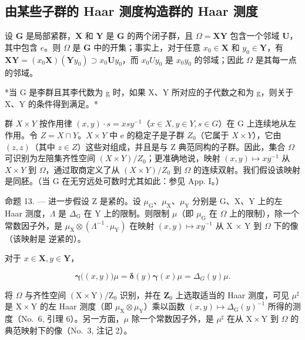 \subsection{由某些子群的 Haar 测度构造群的 Haar 测度}

设 \(\mathbf{G}\) 是局部紧群，\(\mathbf{X}\) 和 \(\mathbf{Y}\) 是 \(\mathbf{G}\) 的两个闭子群，且 \(\Omega = \mathbf{XY}\) 包含一个邻域 \(\mathbf{U}\)，其中包含 \(e\)。则 \(\Omega\) 是 \(\mathbf{G}\) 中的开集；事实上，对于任意 \(x_0 \in \mathbf{X}\) 和 \(y_0 \in \mathbf{Y}\)，有 \(\mathbf{XY} = (x_0\mathbf{X})(\mathbf{Y}y_0) \supset x_0\mathbf{U}y_0\)，而 \(x_{0}Uy_{0}\) 是 \(x_{0}y_{0}\) 的邻域；因此 \(\Omega\) 是其每一点的邻域。

*当 G 是李群且其李代数为 g 时，如果 X、Y 所对应的子代数之和为 g，则关于 X、Y 的条件得到满足。*

群 \(X \times Y\) 按作用律 \((x, y) \cdot s = xsy^{-1}\)（\(x \in X, y \in Y, s \in G\)）在 G 上连续地从左作用。令 \(Z = X \cap Y\)。\(X \times Y\) 中 e 的稳定子是子群 \(Z_{0}\)（它属于 \(X \times Y\)），它由 \((z, z)\)（其中 \(z \in Z\)）这些对组成，并且是与 Z 典范同构的子群。因此，集合 \(\Omega\) 可识别为左陪集齐性空间 \((X \times Y)/Z_{0}\)；更准确地说，映射 \((x, y) \mapsto xy^{-1}\) 从 \(X \times Y\) 到 \(\Omega\)，通过取商定义了从 \((X \times Y)/Z_{0}\) 到 \(\Omega\) 的连续双射。我们假设该映射是同胚。（当 G 在无穷远处可数时尤其如此：参见 App. I。）

命题 13. --- 进一步假设 Z 是紧的。设 \(\mu_{\mathrm{G}}\)、\(\mu_{\mathrm{X}}\)、\(\mu_{\mathrm{Y}}\) 分别是 G、X、Y 上的左 Haar 测度，\(\Lambda\) 是 \(\Delta_{\mathrm{G}}\) 在 Y 上的限制。则限制 \(\mu\)（即 \(\mu_{\mathrm{G}}\) 在 \(\Omega\) 上的限制），除一个常数因子外，是 \(\mu_{\mathrm{X}} \otimes (\Lambda^{-1} \cdot \mu_{\mathrm{Y}})\) 在映射 \((x, y) \mapsto xy^{-1}\) 从 X × Y 到 \(\Omega\) 下的像（该映射是 逆紧的）。

对于 \(x\in \mathbf{X},y\in \mathbf{Y}\)，

\[
\boldsymbol {\gamma} \big ((x, y) \big) \mu = \boldsymbol {\delta} (y) \boldsymbol {\gamma} (x) \mu = \Delta_ {G} (y) \mu .
\]

将 \(\Omega\) 与齐性空间 \((\mathrm{X} \times \mathrm{Y}) / \mathrm{Z}_0\) 识别，并在 \(\mathbf{Z}_0\) 上选取适当的 Haar 测度，可见 \(\mu^\sharp\) 是 \(\mathrm{X} \times \mathrm{Y}\) 的左 Haar 测度（即 \(\mu_{\mathrm{X}} \otimes \mu_{\mathrm{Y}}\)）乘以函数 \((x, y) \mapsto \Delta_{\mathrm{G}}(y)^{-1}\) 所得的测度（No.~6, 引理 6）。另一方面，\(\mu\) 除一个常数因子外，是 \(\mu^\sharp\) 在从 \(\mathrm{X} \times \mathrm{Y}\) 到 \(\Omega\) 的典范映射下的像（No.~3, 注记 2）。

